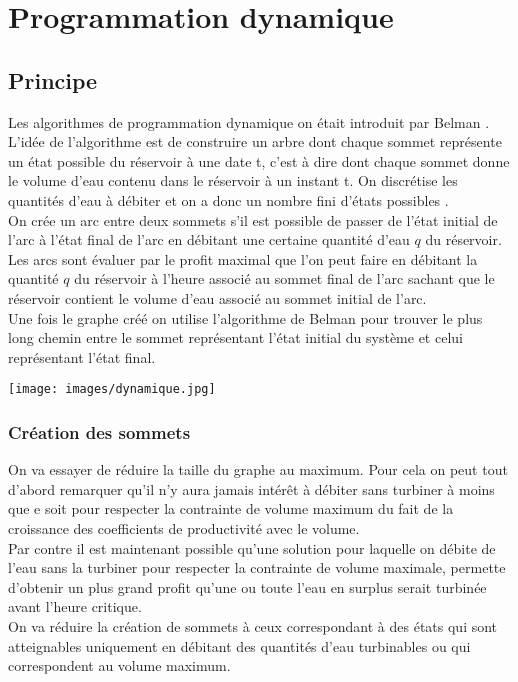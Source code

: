 \documentclass[a4paper]{report}
\begin{document}
\section{Programmation dynamique}
\subsection{Principe}
Les algorithmes de programmation dynamique on était introduit par Belman \cite{dynaRef}.\\
L'idée de l'algorithme est de construire un arbre dont chaque sommet représente un état possible du réservoir à une date t, c'est à dire
dont chaque sommet donne le
volume d'eau contenu dans le réservoir à un instant t. On discrétise les quantités d'eau à débiter et on a donc un nombre fini d'états 
possibles . \\
On crée un arc entre deux sommets s'il est possible de passer de l'état initial de l'arc à l'état final de l'arc en débitant une 
certaine quantité d'eau $q$ du réservoir. Les arcs sont évaluer par le profit maximal que l'on peut faire en débitant la quantité
$q$ du réservoir à l'heure associé au sommet final de l'arc sachant que le réservoir contient le volume d'eau associé au sommet initial de
l'arc.\\
Une fois le graphe créé on utilise l'algorithme de Belman pour trouver le plus long chemin entre le sommet représentant l'état initial
du système et celui représentant l'état final.


 \begin{center}
 \texttt{[image: images/dynamique.jpg]}
 \end{center}
\subsubsection*{Création des sommets}
On va essayer de réduire la taille du graphe au maximum. Pour cela on peut tout d'abord remarquer qu'il n'y aura jamais intérêt à débiter
sans turbiner à moins que e soit pour respecter la contrainte de volume maximum du fait de la croissance des coefficients de productivité avec le volume.\\
Par contre il est maintenant possible qu'une solution pour laquelle on débite de l'eau sans la turbiner pour respecter la contrainte de
volume maximale, permette d'obtenir un plus grand profit qu'une ou toute l'eau en surplus serait turbinée avant l'heure critique.\\
On va réduire la création de sommets à ceux correspondant à des états qui sont atteignables uniquement en débitant des quantités d'eau
turbinables ou qui correspondent au volume maximum.
\end{document}
